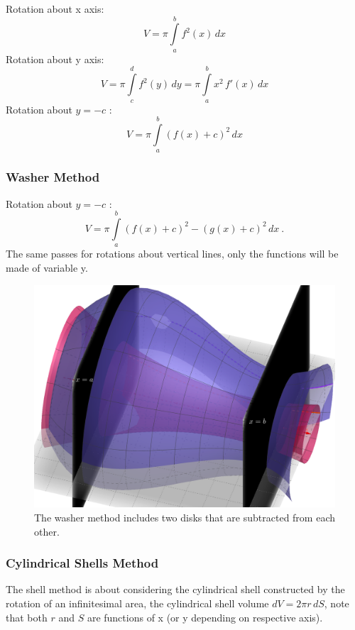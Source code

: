 \documentclass[12pt]{article}
\begin{document}
Rotation about x axis: $$V=\pi \int \limits_a^b f^2(x)\,dx$$
Rotation about y axis: $$V=\pi \int \limits_c^d f^2(y)\,dy =\pi \int \limits_a^b x^2\,f'(x)\,dx $$
Rotation about $y=-c$ : $$V=\pi \int \limits_a^b (f(x)+c)^2\,dx$$
\newpage
\subsubsection{Washer Method}
Rotation about $y=-c$ : $$V=\pi \int \limits_a^b (f(x)+c)^2-(g(x)+c)^2\,dx\ .$$ The same passes for rotations about vertical lines, only the functions will be made of variable y.
\begin{figure}[H]
\centering
\includegraphics[scale=0.42]{washer.png}
\caption{The washer method includes two disks that are subtracted from each other.}
\end{figure}
\newpage
\subsubsection{Cylindrical Shells Method}
The shell method is about considering the cylindrical shell constructed by the rotation of an infinitesimal area, the cylindrical shell volume $dV=2\pi r\,dS$, note that both $r$ and $S$ are functions of x (or y depending on respective axis).
\end{document}
